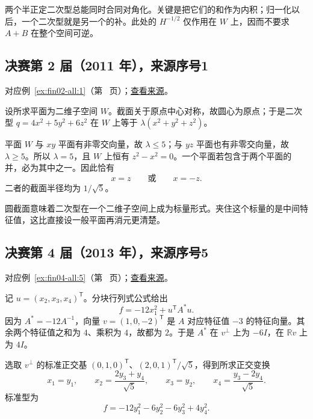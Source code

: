 \documentclass[12pt,fontset=fandol]{ctexart}
\begin{document}
\begin{remark}[方法与条件]

两个半正定二次型总能同时合同对角化。关键是把它们的和作为内积；归一化以后，一个二次型就是另一个的补。此处的 $H^{-1/2}$ 仅作用在 $W$ 上，因而不要求 $A+B$ 在整个空间可逆。

\end{remark}

\subsection{决赛第 2 届（2011 年），来源序号1}\label{ans:fin02-all:1}\label{pr:fin02-all:1}

对应例~\ref{ex:fin02-all:1}（第~\pageref{ex:fin02-all:1} 页）；\href{https://github.com/lzxcr/cmc-mathematics/blob/64916fa1fdbc3e444a652eca204d5669058ee321/src/problems/finals/02/01.md}{查看来源}。

\begin{solve}

设所求平面为二维子空间 $W$。截面关于原点中心对称，故圆心为原点；于是二次型
$q=4x^2+5y^2+6z^2$ 在 $W$ 上等于 $\lambda(x^2+y^2+z^2)$。

平面 $W$ 与 $xy$ 平面有非零交向量，故 $\lambda\le5$；与 $yz$ 平面也有非零交向量，故 $\lambda\ge5$。所以 $\lambda=5$，且 $W$ 上恒有 $z^2-x^2=0$。一个平面若包含于两个平面的并，必为其中之一。因此恰有
\[
x=z\qquad\text{或}\qquad x=-z.
\]
二者的截面半径均为 $1/\sqrt5$。

\end{solve}

\begin{remark}[方法与条件]

圆截面意味着二次型在一个二维子空间上成为标量形式。夹住这个标量的是中间特征值，这比直接设一般平面再消元更清楚。

\end{remark}

\subsection{决赛第 4 届（2013 年），来源序号5}\label{ans:fin04-all:5}\label{pr:fin04-all:5}

对应例~\ref{ex:fin04-all:5}（第~\pageref{ex:fin04-all:5} 页）；\href{https://github.com/lzxcr/cmc-mathematics/blob/64916fa1fdbc3e444a652eca204d5669058ee321/src/problems/finals/04/05.md}{查看来源}。

\begin{solve}

记 $u=(x_2,x_3,x_4)^{\mathsf T}$。分块行列式公式给出
\[
f=-12x_1^2+u^{\mathsf T}A^*u.
\]
因为 $A^*=-12A^{-1}$，向量 $v=(1,0,-2)^{\mathsf T}$ 是 $A$ 对应特征值 $-3$ 的特征向量。其余两个特征值之和为 $4$、乘积为 $4$，故都为 $2$。于是 $A^*$ 在 $v^\perp$ 上为 $-6I$，在 $\mathbb Rv$ 上为 $4I$。

选取 $v^\perp$ 的标准正交基 $(0,1,0)^{\mathsf T}$、$(2,0,1)^{\mathsf T}/\sqrt5$，得到所求正交变换
\[
x_1=y_1,\qquad x_2=\frac{2y_3+y_4}{\sqrt5},\qquad
x_3=y_2,\qquad x_4=\frac{y_3-2y_4}{\sqrt5}.
\]
标准型为
\[
f=-12y_1^2-6y_2^2-6y_3^2+4y_4^2.
\]

\end{solve}
\end{document}
